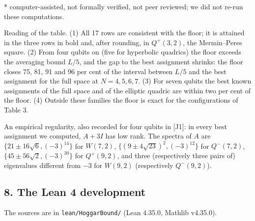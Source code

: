 \documentclass[11pt,a4paper]{article}
\begin{document}
* computer-assisted, not formally verified, not peer reviewed; we did not re-run these computations.

Reading of the table. (1) All 17 rows are consistent with the floor; it is attained in the three rows
in bold and, after rounding, in \(Q^+(3,2)\), the Mermin--Peres square. (2) From four qubits on (five for
hyperbolic quadrics) the floor exceeds the averaging bound \(L/5\), and the gap to the best assignment
shrinks: the floor closes 75, 81, 91 and 96 per cent of the interval between \(L/5\) and the best
assignment for the full space at \(N = 4, 5, 6, 7\). (3) For seven qubits the best known assignments of
the full space and of the elliptic quadric are within two per cent of the floor. (4) Outside these
families the floor is exact for the configurations of Table 3.

An empirical regularity, also recorded for four qubits in {[}J1{]}: in every best assignment we computed,
\(A + 3I\) has low rank. The spectra of \(A\) are \(\{21 \pm 16\sqrt6, (-3)^{14}\}\) for \(W(7,2)\),
\(\{(9 \pm 4\sqrt{23})^2, (-3)^{12}\}\) for \(Q^-(7,2)\), \(\{45 \pm 56\sqrt2, (-3)^{30}\}\) for \(Q^+(9,2)\), and three
(respectively three pairs of) eigenvalues different from \(-3\) for \(W(9,2)\) (respectively \(Q^-(9,2)\)).

\subsection{8. The Lean 4 development}\label{8-the-lean-4-development}

The sources are in \texttt{lean/HoggarBound/} (Lean 4.35.0, Mathlib v4.35.0).
\end{document}
